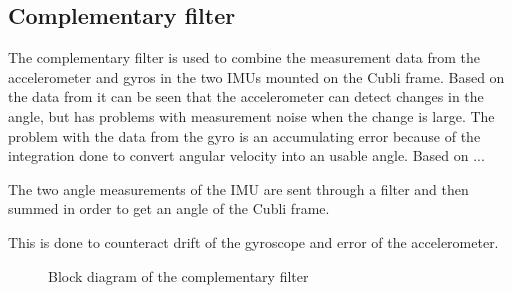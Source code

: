 \subsection{Complementary filter}
The complementary filter is used to combine the measurement data from the accelerometer and gyros in the two IMUs mounted on the Cubli frame. 
Based on the data from  it can be seen that the accelerometer can detect changes in the angle, but has problems with measurement noise when the change is large. The problem with the data from the gyro is an accumulating error because of the integration done to convert angular velocity into an usable angle.
Based on ... 

The two angle measurements of the IMU are sent through a filter and then summed in order to get an angle of the Cubli frame.
 
This is done to counteract drift of the gyroscope and error of the accelerometer. 

\begin{figure}[H]
	
	\centering
	\caption{Block diagram of the complementary filter}
	\label{blockDrawingComplementaryFilter}
\end{figure}


